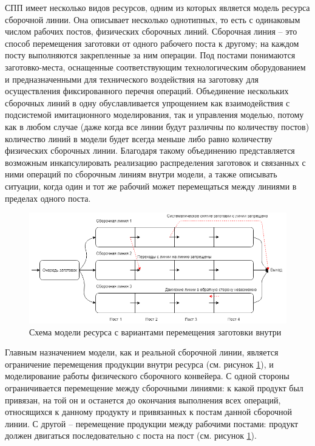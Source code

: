 \indent СПП имеет несколько видов ресурсов, одним из которых является модель ресурса сборочной линии.
Она описывает несколько однотипных, то есть с одинаковым числом рабочих постов, физических сборочных линий.
Сборочная линия -- это способ перемещения заготовки от одного рабочего поста к другому; на каждом посту выполняются закрепленные за ним операции.
Под постами понимаются заготовко-места, оснащенные соответствующим технологическим оборудованием и предназначенными для технического воздействия на заготовку для осуществления фиксированного перечня операций.
Объединение нескольких сборочных линий в одну обуславливается упрощением как взаимодействия с подсистемой имитационного моделирования, так и управления моделью, потому как в любом случае (даже когда все линии будут различны по количеству постов) количество линий в модели будет всегда меньше либо равно количеству физических сборочных линии.
Благодаря такому объединению представляется возможным инкапсулировать реализацию распределения заготовок и связанных с ними операций по сборочным линиям внутри модели, а также описывать ситуации, когда один и тот же рабочий может перемещаться между линиями в пределах одного поста.

\begin{figure}[ht]
	\centering
	\includegraphics[width=\linewidth]{pics/assemblyMain.png}
	\caption{Схема модели ресурса с вариантами перемещения заготовки внутри}
	\label{fig:assemblyMain}
\end{figure}

\indent Главным назначением модели, как и реальной сборочной линии, является ограничение перемещения продукции внутри ресурса (см. рисунок \ref{fig:assemblyMain}), и моделирование работы физического сборочного конвейера.
С одной стороны ограничивается перемещение между сборочными линиями: к какой продукт был привязан, на той он и останется до окончания выполнения всех операций, относящихся к данному продукту и привязанных к постам данной сборочной линии.
С другой -- перемещение продукции между рабочими постами: продукт должен двигаться последовательно с поста на пост (см. рисунок \ref{fig:assemblyMain}).\\

